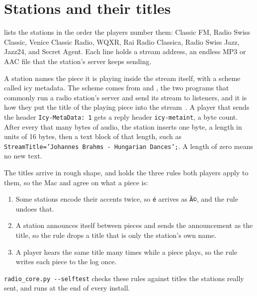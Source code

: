 \documentclass[11pt,a4paper]{article}
\begin{document}
\section*{Stations and their titles}

 lists the stations in the order the players number them: Classic FM, Radio Swiss Classic, Venice Classic Radio, WQXR, Rai Radio Classica, Radio Swiss Jazz, Jazz24, and Secret Agent. Each line holds a stream address, an endless MP3 or AAC file that the station's server keeps sending.

A station names the piece it is playing inside the stream itself, with a scheme called icy metadata.  The scheme comes from  and , the two programs that commonly run a radio station's server and send its stream to listeners, and it is how they put the title of the playing piece into the stream~\cite{icy}. A player that sends the header \texttt{Icy-MetaData: 1} gets a reply header \texttt{icy-metaint}, a byte count. After every that many bytes of audio, the station inserts one byte, a length in units of 16 bytes, then a text block of that length, such as \texttt{StreamTitle='Johannes Brahms - Hungarian Dances';}. A length of zero means no new text.

The titles arrive in rough shape, and  holds the three rules both players apply to them, so the Mac and  agree on what a piece is:
\begin{enumerate}[nosep]
  \item {} Some stations encode their accents twice, so \texttt{é} arrives as \texttt{Ã©}, and the rule undoes that.
  \item A station announces itself between pieces and sends the announcement as the title, so the rule drops a title that is only the station's own name.
  \item A player hears the same title many times while a piece plays, so the rule writes each piece to the log once.
\end{enumerate}
\texttt{radio\_core.py -{}-selftest} checks these rules against titles the stations really sent, and runs at the end of every install.
\end{document}
